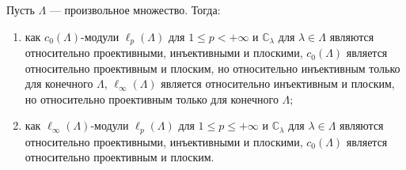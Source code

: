 \begin{proposition}\label{c0AndlInftyModsRelTh} Пусть $\Lambda$ --- произвольное
множество. Тогда:

\begin{enumerate}[label = (\roman*)]
    \item как $c_0(\Lambda)$-модули $\ell_p(\Lambda)$ для $1\leq p<+\infty$ и
    $\mathbb{C}_\lambda$ для $\lambda\in\Lambda$ являются относительно
    проективными, инъективными и плоскими, $c_0(\Lambda)$ является относительно
    проективным и плоским, но относительно инъективным только для конечного
    $\Lambda$, $\ell_\infty(\Lambda)$ является относительно инъективным и
    плоским, но относительно проективным только для конечного $\Lambda$;

    \item как $\ell_\infty(\Lambda)$-модули $\ell_p(\Lambda)$ для $1\leq
    p\leq+\infty$ и $\mathbb{C}_\lambda$ для $\lambda\in\Lambda$ являются
    относительно проективными, инъективными и плоскими, $c_0(\Lambda)$ является
    относительно проективным и плоским.
\end{enumerate}
\end{proposition}
